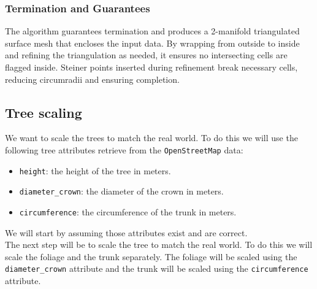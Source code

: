 \documentclass[12pt]{article}
\begin{document}
\subsubsection{Termination and Guarantees}
The algorithm guarantees termination and produces a 2-manifold triangulated
surface mesh that encloses the input data. By wrapping from outside to inside
and refining the triangulation as needed, it ensures no intersecting cells are
flagged inside. Steiner points inserted during refinement break necessary cells,
 reducing circumradii and ensuring completion.

\subsection{Tree scaling}
We want to scale the trees to match the real world. To do this we will use the
following tree attributes retrieve from the \texttt{OpenStreetMap} data:
\begin{itemize}
    \item \texttt{height}: the height of the tree in meters.
    \item \texttt{diameter\_crown}: the diameter of the crown in meters.
    \item \texttt{circumference}: the circumference of the trunk in meters.
\end{itemize}

We will start by assuming those attributes exist and are correct.\\
The next step will be to scale the tree to match the real world. To do this we
will scale the foliage and the trunk separately. The foliage will be scaled
using the \texttt{diameter\_crown} attribute and the trunk will be scaled using
the \texttt{circumference} attribute.\\
\end{document}
